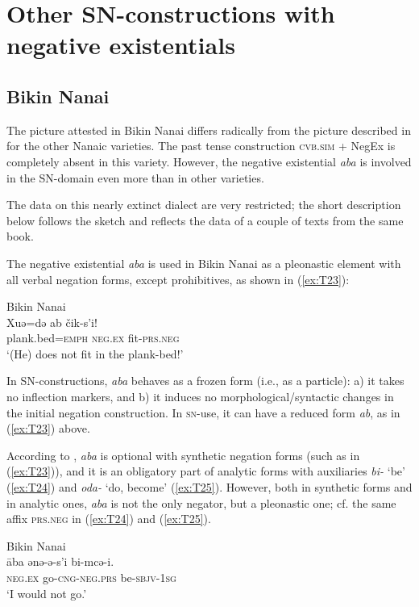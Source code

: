 \documentclass[output=paper,colorlinks,citecolor=brown]{langscibook}
\begin{document}
\section{Other SN-constructions with negative existentials}\label{sec:T6}

\subsection{Bikin Nanai}\label{sec:T6.1}

The picture attested in Bikin Nanai differs radically from the picture described in    for the other Nanaic varieties. The past tense construction \textsc{cvb.sim} + NegEx is completely absent in this variety. However, the negative existential \textit{aba} is involved in the SN-domain even more than in other varieties.

The data on this nearly extinct dialect are very restricted; the short description below follows the sketch \citep{sem1976a} and reflects the data of a couple of texts from the same book.

The negative existential \textit{aba} is used in Bikin Nanai as a pleonastic element with all verbal negation forms, except prohibitives, as shown in (\ref{ex:T23}):

\ea Bikin Nanai \label{ex:T23}\\
	\gll Xuə=də	ab	čik-s'i!\\
	plank.bed=\textsc{emph}	\textsc{neg.ex}	fit-\textsc{prs.neg}\\
	\glt `(He) does not fit in the plank-bed!' \citep[text 2]{sem1976a}
\z

In SN-constructions, \textit{aba} behaves as a frozen form (i.e., as a particle): a) it takes no inflection markers, and b) it induces no morphological/syntactic changes in the initial negation construction. In \textsc{sn}-use, it can have a reduced form \textit{ab}, as in (\ref{ex:T23}) above.

According to \citet{sem1976a}, \textit{aba} is optional with synthetic negation forms (such as in (\ref{ex:T23})), and it is an obligatory part of analytic forms with auxiliaries \textit{bi-} ‘be’ (\ref{ex:T24}) and \textit{oda-} ‘do, become’ (\ref{ex:T25}). However, both in synthetic forms and in analytic ones, \textit{aba} is not the only negator, but a pleonastic one; cf. the same affix \textsc{prs.neg} in (\ref{ex:T24}) and (\ref{ex:T25}).

\ea Bikin Nanai \label{ex:T24}\\
	\gll āba ənə-ə-s’i bi-mcə-i.\\
	\textsc{neg.ex} go-\textsc{cng-neg.prs} be-\textsc{sbjv-1sg}\\
	\glt `I would not go.' \citep[76]{sem1976a}
\z
\end{document}
